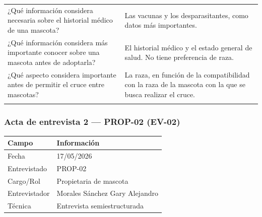 \documentclass[journal,onecolumn]{IEEEtran}
\begin{document}
{\begin{longtable}{@{}p{5.6cm} p{9.4cm}@{}}
		¿Qué información considera necesaria sobre el historial médico de una mascota? & Las vacunas y los desparasitantes, como datos más importantes. \\ \addlinespace
		
		¿Qué información considera más importante conocer sobre una mascota antes de adoptarla? & El historial médico y el estado general de salud. No tiene preferencia de raza. \\ \addlinespace
		
		¿Qué aspecto considera importante antes de permitir el cruce entre mascotas? & La raza, en función de la compatibilidad con la raza de la mascota con la que se busca realizar el cruce. \\ \addlinespace
		
	\end{longtable}
}


\subsubsection*{Acta de entrevista 2 --- PROP-02 (EV-02)}

\begin{table}[H]
	\centering\small
	\begin{tabularx}{\textwidth}{@{}l X@{}}
		\toprule
		\textbf{Campo} & \textbf{Información} \\
		\midrule
		
		Fecha & 17/05/2026 \\
		
		Entrevistado & PROP-02 \\
		
		Cargo/Rol & Propietaria de mascota \\
		
		Entrevistador & Morales Sánchez Gary Alejandro \\
		
		Técnica & Entrevista semiestructurada \\
		
		\bottomrule
	\end{tabularx}
\end{table}
\end{document}
